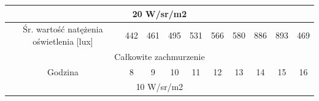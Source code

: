 \documentclass[a4paper,12pt]{article}
\begin{document}
\begin{table}[!ht]
\begin{tabular}{|c|c|c|c|c|c|c|c|c|c|}
\multicolumn{10}{|c|}{20 W/sr/m2}                                                                                                                                                                                                                                                                                                                                                                                                                                                                                                                                  \\ \hline
Śr. wartość natężenia oświetlenia {[}lux{]}                       & \cellcolor[HTML]{CDD6F1}442                        & \cellcolor[HTML]{CDD6F1}461                        & \cellcolor[HTML]{CDD6F1}495                        & \cellcolor[HTML]{CDD6F1}531                        & \cellcolor[HTML]{CDD6F1}566                        & \cellcolor[HTML]{CDD6F1}580                        & \cellcolor[HTML]{CDD6F1}886                        & \cellcolor[HTML]{CDD6F1}893                        & \cellcolor[HTML]{CDD6F1}469                        \\ \hline
\multicolumn{10}{|c|}{\cellcolor[HTML]{C3C3C3}Całkowite zachmurzenie}                                                                                                                                                                                                                                                                                                                                                                                                                                                                                              \\ \hline
Godzina                                                               & 8                                                  & 9                                                  & 10                                                 & 11                                                 & 12                                                 & 13                                                 & 14                                                 & 15                                                 & 16                                                 \\ \hline
\multicolumn{10}{|c|}{10 W/sr/m2}                                                                                                                                                                                                                                                                                                                                                                                                                                                                                                                                  \\ \hline

\end{tabular}
\end{table}
\end{document}
